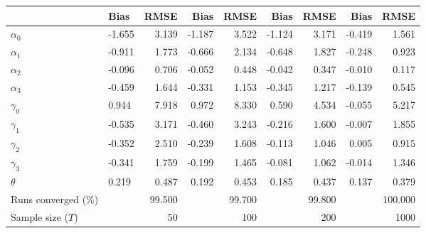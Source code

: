
\begin{tabular}[t]{llrrrrrrr}
\toprule
  & Bias & RMSE & Bias & RMSE & Bias & RMSE & Bias & RMSE\\
\midrule
$\alpha_{0}$ & -1.655 & 3.139 & -1.187 & 3.522 & -1.124 & 3.171 & -0.419 & 1.561\\
$\alpha_{1}$ & -0.911 & 1.773 & -0.666 & 2.134 & -0.648 & 1.827 & -0.248 & 0.923\\
$\alpha_{2}$ & -0.096 & 0.706 & -0.052 & 0.448 & -0.042 & 0.347 & -0.010 & 0.117\\
$\alpha_{3}$ & -0.459 & 1.644 & -0.331 & 1.153 & -0.345 & 1.217 & -0.139 & 0.545\\
$\gamma_{0}$ & 0.944 & 7.918 & 0.972 & 8.330 & 0.590 & 4.534 & -0.055 & 5.217\\
$\gamma_{1}$ & -0.535 & 3.171 & -0.460 & 3.243 & -0.216 & 1.600 & -0.007 & 1.855\\
$\gamma_{2}$ & -0.352 & 2.510 & -0.239 & 1.608 & -0.113 & 1.046 & 0.005 & 0.915\\
$\gamma_{3}$ & -0.341 & 1.759 & -0.199 & 1.465 & -0.081 & 1.062 & -0.014 & 1.346\\
$\theta$ & 0.219 & 0.487 & 0.192 & 0.453 & 0.185 & 0.437 & 0.137 & 0.379\\
Runs converged (\%) &  & 99.500 &  & 99.700 &  & 99.800 &  & 100.000\\
Sample size ($T$) &  & 50 &  & 100 &  & 200 &  & 1000\\
\bottomrule
\end{tabular}
